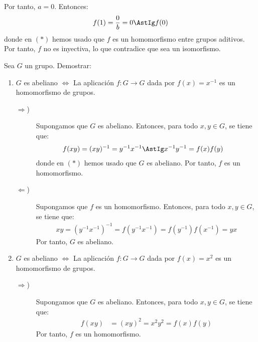 \begin{ejercicio}
\begin{enumerate}
\begin{description}
            Por tanto, $a=0$. Entonces:
            \begin{equation*}
                f(1)=\dfrac{0}{b}=0 \AstIg f(0)
            \end{equation*}
            donde en $(\ast)$ hemos usado que $f$ es un homomorfismo entre grupos aditivos. Por tanto, $f$ no es inyectiva, lo que contradice que sea un isomorfismo.
        \end{description}
    \end{enumerate}
\end{ejercicio}

\begin{ejercicio}\label{ej:2.37}
    Sea $G$ un grupo. Demostrar:
    \begin{enumerate}
        \item $G$ es abeliano $\iff$ La aplicación $f : G \to G$ dada por $f(x) = x^{-1}$ es un homomorfismo de grupos.
        \begin{description}
            \item[$\Longrightarrow$)] Supongamos que $G$ es abeliano. Entonces, para todo $x,y\in G$, se tiene que:
            \begin{align*}
                f(xy)&=(xy)^{-1}=y^{-1}x^{-1}\AstIg x^{-1}y^{-1}=f(x)f(y)
            \end{align*}
            donde en $(\ast)$ hemos usado que $G$ es abeliano. Por tanto, $f$ es un homomorfismo.

            \item[$\Longleftarrow$)] Supongamos que $f$ es un homomorfismo. Entonces, para todo $x,y\in G$, se tiene que:
            \begin{align*}
                xy=(y^{-1}x^{-1})^{-1}=f(y^{-1}x^{-1})=f(y^{-1})f(x^{-1})=yx
            \end{align*}
            Por tanto, $G$ es abeliano.
        \end{description}
        \item $G$ es abeliano $\iff$ La aplicación $f : G \to G$ dada por $f(x) = x^2$ es un homomorfismo de grupos.
        \begin{description}
            \item[$\Longrightarrow$)] Supongamos que $G$ es abeliano. Entonces, para todo $x,y\in G$, se tiene que:
            \begin{align*}
                f(xy)&=(xy)^2=x^2y^2=f(x)f(y)
            \end{align*}
            Por tanto, $f$ es un homomorfismo.


\end{description}
\end{enumerate}
\end{ejercicio}
